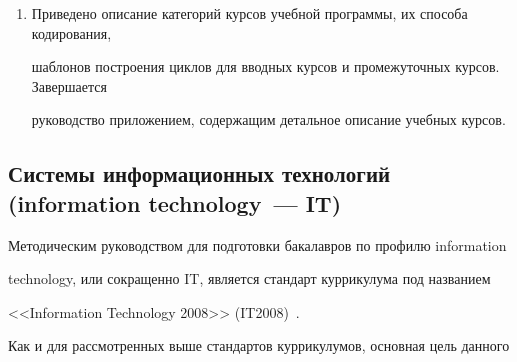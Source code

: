 \begin{enumerate}[1.]
\begin{enumerate}[(1)]
\item SAS.bio~--- <<Биомедицинские системы>>;

\item SAS.sci~--- <<Научно-исследовательские системы>>;

\item SAS.tel~--- <<Телекоммуникационные системы>>;

\item SAS.av~--- <<Авиационное электронное оборудование и транспортные 

системы>>;

\item SAS.ind~--- <<Системы контроля промышленного процесса>>;

\item SAS.mm~--- <<Мультимедийные, игровые и развлекательные системы>>;

\item SAS.mob~--- <<Системы для малых и мобильных платформ>>;

\item SAS.ab~--- <<Cистемы, основанные на агентах>> (agent-based systems).

\end{enumerate}



\item Приведено описание категорий курсов учебной программы, их способа кодирования, 

шаблонов построения циклов для вводных курсов и промежуточных курсов. Завершается 

руководство приложением, содержащим детальное описание учебных курсов. 

\end{enumerate}



\subsection{Системы информационных технологий (information technology~--- IT)}



      Методическим руководством для подготовки бакалавров по профилю information 

technology, или сокращенно IT, является стандарт куррикулума под названием 

<<Information Technology 2008>> (IT2008)~\cite{17-s}.



Как и для рассмотренных выше стандартов куррикулумов, основная цель данного 


